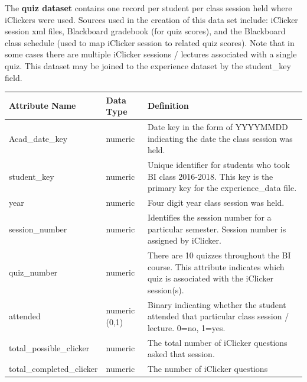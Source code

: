 \documentclass[
]{article}
\begin{document}
The \textbf{quiz dataset} contains one record per student per class
session held where iClickers were used. Sources used in the creation of
this data set include: iClicker session xml files, Blackboard gradebook
(for quiz scores), and the Blackboard class schedule (used to map
iClicker session to related quiz scores). Note that in some cases there
are multiple iClicker sessions / lectures associated with a single quiz.
This dataset may be joined to the experience dataset by the student\_key
field.

\begin{longtable}[]{@{}
  >{\raggedright\arraybackslash}p{}
  >{\raggedright\arraybackslash}p{}
  >{\raggedright\arraybackslash}p{}@{}}
\toprule\noalign{}
\begin{minipage}[b]{\linewidth}\raggedright
Attribute Name
\end{minipage} & \begin{minipage}[b]{\linewidth}\raggedright
Data Type
\end{minipage} & \begin{minipage}[b]{\linewidth}\raggedright
Definition
\end{minipage} \\
\midrule\noalign{}
\endhead
\bottomrule\noalign{}
\endlastfoot
Acad\_date\_key & numeric & Date key in the form of YYYYMMDD indicating
the date the class session was held. \\
student\_key & numeric & Unique identifier for students who took BI
class 2016-2018. This key is the primary key for the experience\_data
file. \\
year & numeric & Four digit year class session was held. \\
session\_number & numeric & Identifies the session number for a
particular semester. Session number is assigned by iClicker. \\
quiz\_number & numeric & There are 10 quizzes throughout the BI course.
This attribute indicates which quiz is associated with the iClicker
session(s). \\
attended & numeric (0,1) & Binary indicating whether the student
attended that particular class session / lecture. 0=no, 1=yes. \\
total\_possible\_clicker & numeric & The total number of iClicker
questions asked that session. \\
total\_completed\_clicker & numeric & The number of iClicker questions

\end{longtable}
\end{document}
